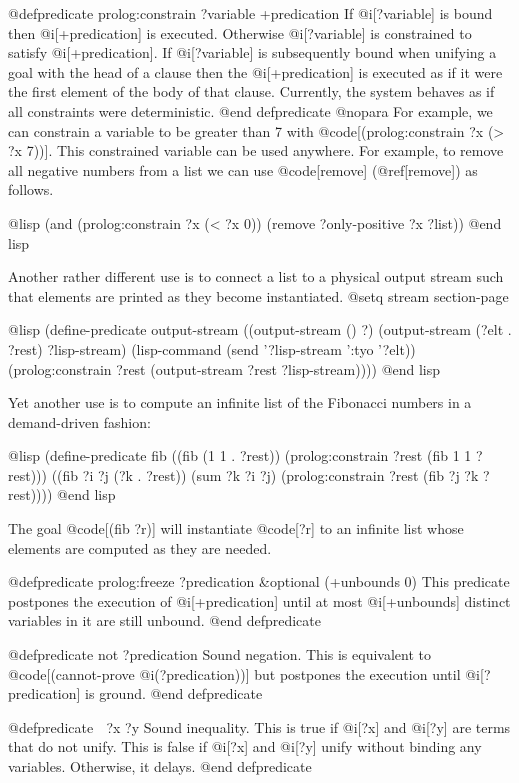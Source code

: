 {@defpredicate prolog:constrain ?variable +predication
If @i[?variable] is bound then @i[+predication] is executed.
Otherwise @i[?variable] is constrained to satisfy @i[+predication].
If @i[?variable] is subsequently bound when unifying a goal
with the head of a clause then the @i[+predication]
is executed as if it were the first element of the body of that clause.
Currently, the system behaves as if all constraints were deterministic.
@end defpredicate
@nopara
For example, we can constrain a variable to be greater than 7 with
@code[(prolog:constrain ?x (> ?x 7))].
This constrained variable can be used anywhere.
For example, to remove all negative numbers from a list we can use
@code[remove] (@ref[remove]) as follows.

@lisp
(and (prolog:constrain ?x (< ?x 0))
     (remove ?only-positive ?x ?list))
@end lisp

Another rather different use is to connect a list to a physical output
stream such that elements are printed as they become instantiated.
@setq stream section-page

@lisp
(define-predicate output-stream
  ((output-stream () ?)
   (output-stream (?elt . ?rest) ?lisp-stream)
   (lisp-command (send '?lisp-stream ':tyo '?elt))
   (prolog:constrain ?rest (output-stream ?rest ?lisp-stream))))
@end lisp

Yet another use is to compute an infinite list of the Fibonacci numbers 
in a demand-driven fashion:

@lisp
(define-predicate fib
  ((fib (1 1 . ?rest))
   (prolog:constrain ?rest (fib 1 1 ?rest)))
  ((fib ?i ?j (?k . ?rest))
   (sum ?k ?i ?j)
   (prolog:constrain ?rest (fib ?j ?k ?rest))))
@end lisp

The goal @code[(fib ?r)] will instantiate @code[?r] to an infinite
list whose elements are computed as they are needed.


@defpredicate prolog:freeze ?predication &optional (+unbounds 0)
This predicate postpones the execution of @i[+predication] until
at most @i[+unbounds] distinct variables in it are still unbound.
@end defpredicate

@defpredicate not ?predication
Sound negation.
This is equivalent to @code[(cannot-prove @i(?predication))]
but postpones the execution until @i[?predication] is ground.
@end defpredicate

@defpredicate  ?x ?y
Sound inequality.
This is true if @i[?x] and @i[?y] are terms that do not unify.
This is false if @i[?x] and @i[?y] unify without binding any variables.
Otherwise, it delays.
@end defpredicate

}
